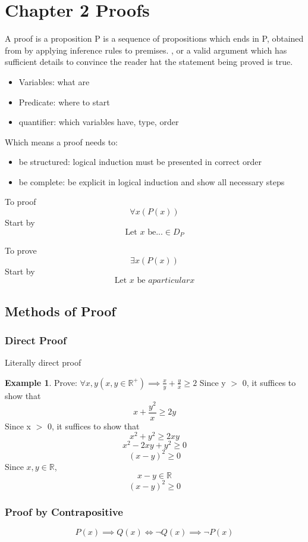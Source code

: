 \documentclass[14pt]{article}
\theoremstyle{definition}
\newtheorem*{example}{Example}
\begin{document}
\section{Chapter 2 Proofs}
A proof is a proposition P is a sequence of propositions which ends in P, obtained from by applying inference rules to premises.
, or a valid argument which has sufficient details to convince the reader hat the statement being proved is true.

\begin{itemize}
    \item Variables: what are
    \item Predicate: where to start
    \item quantifier: which variables have, type, order
\end{itemize}

Which means a proof needs to: 
\begin{itemize}
    \item be structured: logical induction must be presented in correct order
    \item be complete: be explicit in logical induction and show all necessary steps
\end{itemize}

To proof
\[\forall x(P(x))\]
Start by 
\[ \text{Let } x \text{ be} ... \in D_P\]

To prove 
\[\exists x(P(x))\]
Start by 
\[\text{Let } x \text{ be } a particular x\]

\subsection*{Methods of Proof}
\subsubsection{Direct Proof}
Literally direct proof
\begin{example}
    Prove: \(\forall x, y(x, y \in \mathbb{R}^+) \implies \frac{x}{y} + \frac{y}{x} \geq 2\) \newline
    Since y \(>\) 0, it suffices to show that
    \[x + \frac{y^2}{x} \geq 2y\]
    Since x \(>\) 0, it suffices to show that
    \[x^2 + y^2 \geq 2xy\]
    \[x^2 -2xy + y^2 \geq 0\]
    \[(x - y)^2 \geq 0\]
    Since \(x, y \in \mathbb{R}\),
    \[x - y \in \mathbb{R}\]
    \[(x - y)^2 \geq 0\]
\end{example}
\subsubsection{Proof by Contrapositive}
\[P(x) \implies Q(x) \iff \neg Q(x) \implies \neg P(x)\]
\end{document}
